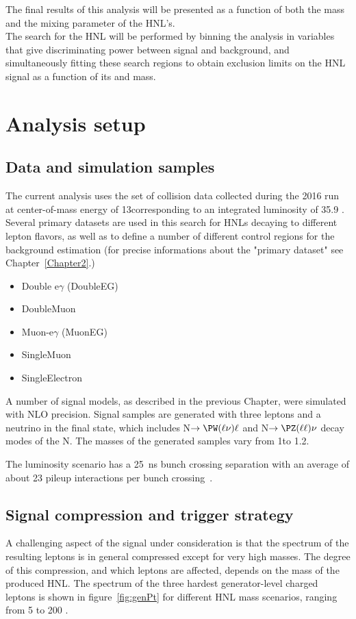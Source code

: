 The final results of this analysis will be presented as a function of both the mass and the mixing parameter of the HNL's. \\
The search for the HNL will be performed by binning the analysis in
variables that give discriminating power between signal and
background, and simultaneously fitting these search regions to obtain
exclusion limits on the HNL signal as a function of its \mixpar and
mass. 

\section{Analysis setup}
\subsection{Data and simulation samples}
The current analysis uses the set of \Pp collision data collected during the 2016 run at center-of-mass energy of 13\TeV corresponding to
an integrated luminosity of 35.9 \fbinv. Several primary datasets are used in this search for HNLs decaying to different lepton flavors, as well as to 
define a number of different control regions for the background estimation (for precise
informations about the "primary dataset" see Chapter~\ref{Chapter2}.)

{\footnotesize
\begin{itemize}
\setlength\itemsep{-0.1em}
\item Double e$\gamma$ (DoubleEG)
\item DoubleMuon
\item Muon-e$\gamma$ (MuonEG)
\item SingleMuon
\item SingleElectron
\end{itemize} }

A number of signal models, as described in the previous
Chapter, were simulated with NLO precision. Signal
samples are generated with three leptons and a neutrino in the final
state, which includes N$\to\PW(\ell\nu)\ell$ and
N$\to\PZ(\ell\ell)\nu$ decay modes of the N. The \hnl masses of the
generated samples vary from 1\GeV to 1.2\TeV. 

The luminosity scenario has a 25~ns bunch crossing separation with an average of about 23 pileup interactions per bunch crossing~\cite{Sirunyan:2020foa}.

\subsection{Signal compression and trigger strategy}\label{sec:compression}
A challenging aspect of the signal under consideration is that the \pt spectrum of the resulting leptons is in general compressed except for very high masses. The degree of this compression, and which leptons are affected, depends on the mass of the produced HNL. The \pt spectrum of the three hardest generator-level charged leptons is shown in figure~\ref{fig:genPt} for different HNL mass scenarios, ranging from 5 to 200 \GeV . 

